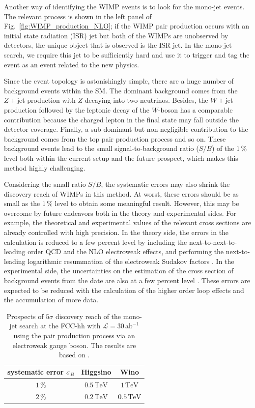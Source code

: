 \documentclass[12pt,twoside,book]{article}
\begin{document}
Another way of identifying the WIMP events is to look for the mono-jet events.
The relevant process is shown in the left panel of Fig.~\ref{fig:WIMP_production_NLO}; if the WIMP pair production occurs with an initial state radiation (ISR) jet but both of the WIMPs are unobserved by detectors, the unique object that is observed is the ISR jet.
In the mono-jet search, we require this jet to be sufficiently hard and use it to trigger and tag the event as an event related to the new physics.

Since the event topology is astonishingly simple, there are a huge number of background events within the SM.
The dominant background comes from the $Z +$jet production with $Z$ decaying into two neutrinos.
Besides, the $W+$jet production followed by the leptonic decay of the $W$-boson has a comparable contribution because the charged lepton in the final state may fall outside the detector coverage.
Finally, a sub-dominant but non-negligible contribution to the background comes from the top pair production process and so on.
These background events lead to the small signal-to-background ratio ($S/B$) of the $1\, \%$ level both within the current setup and the future prospect, which makes this method highly challenging.

Considering the small ratio $S/B$, the systematic errors may also shrink the discovery reach of WIMPs in this method.
At worst, these errors should be as small as the $1\, \%$ level to obtain some meaningful result.
However, this may be overcome by future endeavors both in the theory and experimental sides.
For example, the theoretical and experimental values of the relevant cross sections are already controlled with high precision.
In the theory side, the errors in the calculation is reduced to a few percent level by including the next-to-next-to-leading order QCD and the NLO electroweak effects, and performing the next-to-leading logarithmic resummation of the electroweak Sudakov factors \cite{Lindert:2017olm}.
In the experimental side, the uncertainties on the estimation of the cross section of background events from the date are also at a few percent level \cite{Aaboud:2017phn}.
These errors are expected to be reduced with the calculation of the higher order loop effects and the accumulation of more data.

\begin{table}[t]
  \centering
  \begin{tabular}{c|cc}
    systematic error $\sigma_B$ & Higgsino & Wino\\ \hline
    $1\, \%$ & $0.5\, \mathrm{TeV}$ & $1\,\mathrm{TeV}$ \\
    $2\, \%$ & $0.2\, \mathrm{TeV}$ & $0.5\,\mathrm{TeV}$ \\
  \end{tabular}
  \caption{
    Prospects of $5\sigma$ discovery reach of the mono-jet search at the FCC-hh with $\mathcal{L} = 30\,\mathrm{ab}^{-1}$ using the pair production process via an electroweak gauge boson.
    The results are based on \cite{Han:2018wus}.
  }
  \label{tab:mono-jet}
\end{table}
\end{document}
